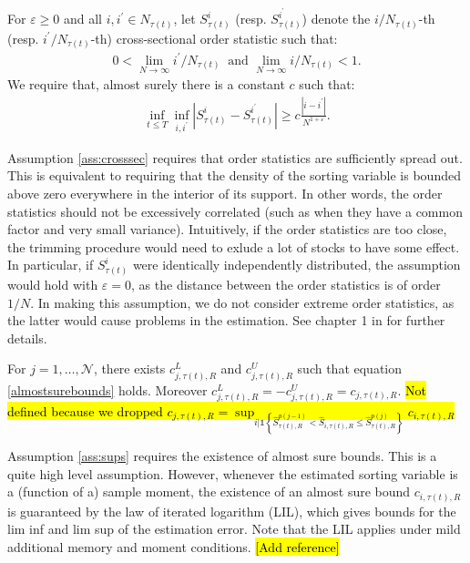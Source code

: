 \begin{assumption}
\label{ass:crosssec} 
For $\varepsilon \geq 0$ and all $i,i^{\prime }\in N_{\tau(t)}$, let $S_{\tau(t) }^{i}$ (resp. $S_{\tau(t) }^{i^{\prime }}$) denote the $i/N_{\tau(t) }$-th (resp. $i^{\prime }/N_{\tau(t) }$-th) cross-sectional order statistic such that:
\begin{align*}
0<\lim_{N\rightarrow \infty }i^{\prime }/N_{\tau(t) }\ \text{ and }\lim_{N\rightarrow \infty }i/N_{\tau(t) }<1. 
\end{align*}
We require that, almost surely there is a constant $c$ such that: 
\begin{align*}
\inf_{t\leq T}\inf_{i,i^{\prime }}\left\vert S_{\tau(t)}^{i}-S_{\tau(t) }^{i^{\prime }}\right\vert \geq c \frac{\left\vert i-i^{\prime }\right\vert }{N^{1+\varepsilon }}. 
\end{align*}
\end{assumption}

\noindent
Assumption \ref{ass:crosssec} requires that order statistics are sufficiently spread out. This is equivalent to requiring that the density of the sorting variable is bounded above zero everywhere in the interior of its support. In other words, the order statistics should not be excessively correlated (such as when they have a common factor and very small variance). Intuitively, if the order statistics are too close, the trimming procedure would need to exlude a lot of stocks to have some effect. In particular, if $S_{\tau(t)}^i$ were identically independently distributed, the assumption would hold with $\varepsilon =0$, as the distance between the order statistics is of order $1/N$. In making this assumption, we do not consider extreme order statistics, as the latter would cause problems in the estimation. See chapter 1 in \cite{reiss2012approximate} for further details.

\begin{assumption}
\label{ass:sups} 
For $j=1,\dots, \mathcal{N}$, there exists $c^L_{j,\tau(t),R}$ and $c^U_{j,\tau(t),R}$ such that equation \eqref{almostsurebounds} holds. Moreover $c^L_{j,\tau(t),R} = - c^U_{j,\tau(t),R} = c_{j,\tau(t),R}$. \hl{Not defined because we dropped $c_{j,\tau(t),R} = \sup_{i \vert \mathds{1} \left\{ \widehat{S}_{\tau(t),R}^{p(j-1)} <\widehat{S}_{i,\tau(t),R} \leq \widehat{S}_{\tau(t),R}^{p(j)} \right\}} c_{i,\tau(t),R}$}
\end{assumption}

\noindent
Assumption \ref{ass:sups} requires the existence of almost sure bounds. This is a quite high level assumption. However, whenever the estimated sorting variable is a (function of a) sample moment, the existence of an almost sure bound $c_{i,\tau(t),R}$ is guaranteed by the law of iterated logarithm (LIL), which gives bounds for the lim inf and lim sup of the estimation error. Note that the LIL applies under mild additional memory and moment conditions. \hl{[Add reference]}

